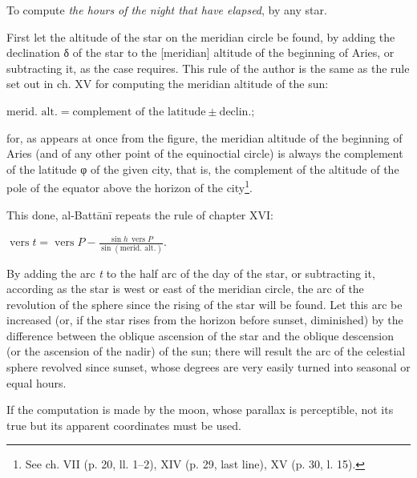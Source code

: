 \documentclass[11pt]{article}
\newcommand{\Pg}[1]{\marginpar{\footnotesize\color{gray}#1}}
\begin{document}
\par To compute \emph{the hours of the night that have elapsed}, by any star.\par
\begin{center}\end{center}
\par \Pg{I 195}First let the altitude of the star on the meridian circle be found, by adding the declination {\greekfont δ} of the star to the [meridian] altitude of the beginning of Aries, or subtracting it, as the case requires. This rule of the author is the same as the rule set out in ch. XV for computing the meridian altitude of the sun: \par\noindent\hspace*{1.5em}$\displaystyle \text{merid. alt.} = \text{complement of the latitude} \pm \text{declin.};$\par for, as appears at once from the figure, the meridian altitude of the beginning of Aries (and of any other point of the equinoctial circle) is always the complement of the latitude {\greekfont φ} of the given city, that is, the complement of the altitude of the pole of the equator above the horizon of the city\footnote{See ch. VII (p. 20, ll. 1–2), XIV (p. 29, last line), XV (p. 30, l. 15).}.\par
\par This done, al-Battānī repeats the rule of chapter XVI: \par\noindent\hspace*{1.5em}$\displaystyle \operatorname{vers} t = \operatorname{vers} P - \frac{\sin h\,\operatorname{vers} P}{\sin(\text{merid. alt.})}.$\par By adding the arc \emph{t} to the half arc of the day of the star, or subtracting it, according as the star is west or east of the meridian circle, the arc of the revolution of the sphere since the rising of the star will be found. Let this arc be increased (or, if the star rises from the horizon before sunset, diminished) by the difference between the oblique ascension of the star and the oblique descension (or the ascension of the nadir) of the sun; there will result the arc of the celestial sphere revolved since sunset, whose degrees are very easily turned into seasonal or equal hours.\par
\par If the computation is made by the moon, whose parallax is perceptible, not its true but its apparent coordinates must be used.\par
\end{document}
